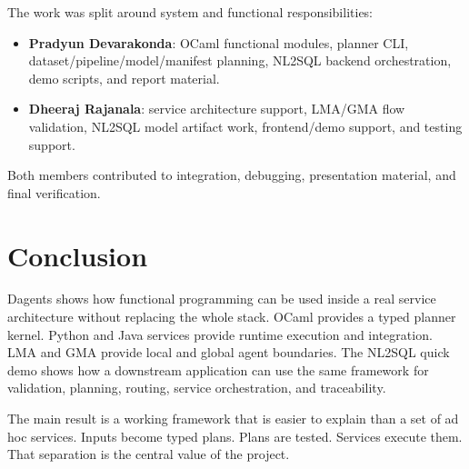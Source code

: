 \documentclass[conference]{IEEEtran}
\begin{document}
The work was split around system and functional responsibilities:

\begin{itemize}
  \item \textbf{Pradyun Devarakonda}: OCaml functional modules, planner CLI,
  dataset/pipeline/model/manifest planning, NL2SQL backend orchestration, demo
  scripts, and report material.
  \item \textbf{Dheeraj Rajanala}: service architecture support, LMA/GMA flow
  validation, NL2SQL model artifact work, frontend/demo support, and testing
  support.
\end{itemize}

Both members contributed to integration, debugging, presentation material, and
final verification.

\section{Conclusion}

Dagents shows how functional programming can be used inside a real service
architecture without replacing the whole stack. OCaml provides a typed planner
kernel. Python and Java services provide runtime execution and integration.
LMA and GMA provide local and global agent boundaries. The NL2SQL quick demo
shows how a downstream application can use the same framework for validation,
planning, routing, service orchestration, and traceability.

The main result is a working framework that is easier to explain than a set of
ad hoc services. Inputs become typed plans. Plans are tested. Services execute
them. That separation is the central value of the project.
\end{document}
